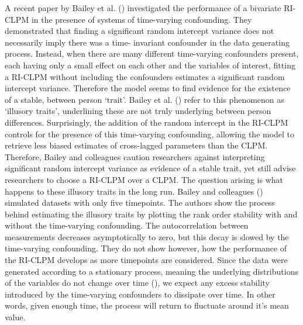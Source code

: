 \documentclass[
  man,
  floatsintext,
  longtable,
  nolmodern,
  notxfonts,
  notimes,
  colorlinks=true,linkcolor=blue,citecolor=blue,urlcolor=blue]{apa7}
\begin{document}
A recent paper by Bailey et al.
() investigated the
performance of a bivariate RI- CLPM in the presence of systems of
time-varying confounding. They demonstrated that finding a significant
random intercept variance does not necessarily imply there was a time-
invariant confounder in the data generating process. Instead, when there
are many different time-varying confounders present, each having only a
small effect on each other and the variables of interest, fitting a
RI-CLPM without including the confounders estimates a significant random
intercept variance. Therefore the model seems to find evidence for the
existence of a stable, between person `trait'. Bailey et al.
() refer to this
phenomenon as `illusory traits', underlining these are not truly
underlying between person differences. Surprisingly, the addition of the
random intercept in the RI-CLPM controls for the presence of this
time-varying confounding, allowing the model to retrieve less biased
estimates of cross-lagged parameters than the CLPM. Therefore, Bailey
and colleagues caution researchers against interpreting significant
random intercept variance as evidence of a stable trait, yet still
advise researchers to choose a RI-CLPM over a CLPM. The question arising
is what happens to these illusory traits in the long run. Bailey and
colleagues ()
simulated datasets with only five timepoints. The authors show the
process behind estimating the illusory traits by plotting the rank order
stability with and without the time-varying confounding. The
autocorrelation between measurements decreases asymptotically to zero,
but this decay is slowed by the time-varying confounding. They do not
show however, how the performance of the RI-CLPM develops as more
timepoints are considered. Since the data were generated according to a
stationary process, meaning the underlying distributions of the
variables do not change over time
(), we expect any excess stability introduced
by the time-varying confounders to dissipate over time. In other words,
given enough time, the process will return to fluctuate around it's mean
value.
\end{document}
